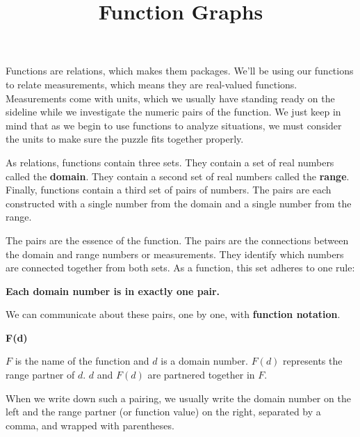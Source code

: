 \documentclass{ximera}
\title{Function Graphs}
\begin{document}
\begin{abstract}

\end{abstract}
\maketitle


Functions are relations, which makes them packages.  We'll be using our functions to relate measurements, which means they are real-valued functions. Measurements come with units, which we usually have standing ready on the sideline while we investigate the numeric pairs of the function. We just keep in mind that as we begin to use functions to analyze situations, we must consider the units to make sure the puzzle fits together properly.



As relations, functions contain three sets.  They contain a set of real numbers called the \textbf{domain}.  They contain a second set of real numbers called the \textbf{range}. Finally, functions contain a third set of pairs of numbers.  The pairs are each constructed with a single number from the domain and a single number from the range.

The pairs are the essence of the function.  The pairs are the connections between the domain and range numbers or measurements.  They identify which numbers are connected together from both sets. As a function, this set adheres to one rule:


\begin{center}
  \textbf{\textcolor{red!70!darkgray}{Each domain number is in exactly one pair.}}
\end{center}



We can communicate about these pairs, one by one, with \textbf{function notation}.



\begin{center}
\textbf{\textcolor{purple!85!blue}{F(d)}}
\end{center}



$F$ is the name of the function and $d$ is a domain number.  $F(d)$ represents the range partner of $d$.  $d$ and $F(d)$ are partnered together in $F$.

When we write down such a pairing, we usually write the domain number on the left and the range partner (or function value) on the right, separated by a comma, and wrapped with parentheses.
\end{document}

